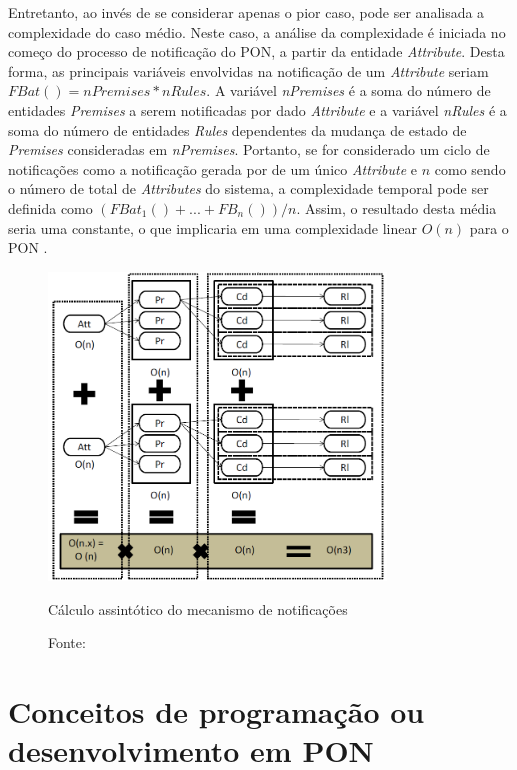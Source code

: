 Entretanto, ao invés de se considerar apenas o pior caso, pode ser analisada a
complexidade do caso médio. Neste caso, a análise da complexidade é iniciada no
começo do processo de notificação do PON, a partir da entidade
\textit{Attribute}. Desta forma, as principais variáveis envolvidas na
notificação de um \textit{Attribute} seriam $FBat() = nPremises * nRules$. A
variável \textit{nPremises} é a soma do número de entidades \textit{Premises} a
serem notificadas por dado \textit{Attribute} e a variável \textit{nRules} é a
soma do número de entidades \textit{Rules} dependentes da mudança de estado de
\textit{Premises} consideradas em \textit{nPremises}. Portanto, se for
considerado um ciclo de notificações como a notificação gerada por de um único
\textit{Attribute} e $n$ como sendo o número de total de \textit{Attributes} do
sistema, a complexidade temporal pode ser definida como $(FBat_{1}()+ ... +
FB_{n}()) / n$. Assim, o resultado desta média seria uma constante, o que
implicaria em uma complexidade linear $O(n)$ para o PON
\cite{doc_simao_2005,msc_Ronszcka_2012,doc_ronszcka_2019}.

\begin{figure}[!htb]
  \centering
  \includegraphics[width=0.8\textwidth]{../figures/calculo_pon.png}
  \smallskip
  \caption{Cálculo assintótico do mecanismo de notificações}
  \caption*{Fonte: }
  \label{fig:calculo_pon}
\end{figure}

\section{Conceitos de programação ou desenvolvimento em
  PON}\label{sec:conceitos_pon}

